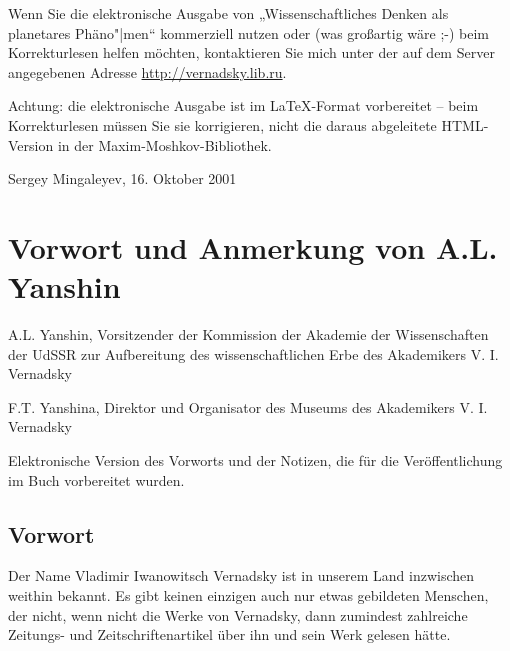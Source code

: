 \documentclass[11pt,a4paper]{article}
\begin{document}
Wenn Sie die elektronische Ausgabe von „Wissenschaftliches Denken als
planetares Phäno"|men“ kommerziell nutzen oder (was großartig wäre ;-) beim
Korrekturlesen helfen möchten, kontaktieren Sie mich unter der auf dem Server
angegebenen Adresse \url{http://vernadsky.lib.ru}.

Achtung: die elektronische Ausgabe ist im \LaTeX-Format vorbereitet -- beim
Korrekturlesen müssen Sie sie korrigieren, nicht die daraus abgeleitete
HTML-Version in der Maxim-Moshkov-Bibliothek.

\begin{flushright}
  Sergey Mingaleyev, 16. Oktober 2001 
\end{flushright}

\section{Vorwort und Anmerkung von A.L. Yanshin}

A.L. Yanshin, Vorsitzender der Kommission der Akademie der Wissenschaften der
UdSSR zur Aufbereitung des wissenschaftlichen Erbe des Akademikers
V. I. Vernadsky

F.T. Yanshina, Direktor und Organisator des Museums des Akademikers
V. I. Vernadsky

Elektronische Version des Vorworts und der Notizen, die für die
Veröffentlichung im Buch \cite{Vernadsky1991} vorbereitet wurden.

\subsection*{Vorwort}

Der Name Vladimir Iwanowitsch Vernadsky ist in unserem Land inzwischen weithin
bekannt. Es gibt keinen einzigen auch nur etwas gebildeten Menschen, der
nicht, wenn nicht die Werke von Vernadsky, dann zumindest zahlreiche Zeitungs-
und Zeitschriftenartikel über ihn und sein Werk gelesen hätte.
\end{document}
